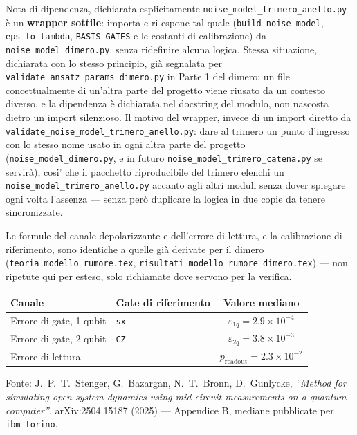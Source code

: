 \documentclass[11pt,a4paper]{article}
\begin{document}
\begin{okbox}{Nota di dipendenza, dichiarata esplicitamente}
\texttt{noise\_model\_trimero\_anello.py} è un \textbf{wrapper sottile}:
importa e ri-espone tal quale (\texttt{build\_noise\_model},
\texttt{eps\_to\_lambda}, \texttt{BASIS\_GATES} e le costanti di
calibrazione) da \texttt{noise\_model\_dimero.py}, senza ridefinire
alcuna logica. Stessa situazione, dichiarata con lo stesso principio, già
segnalata per \texttt{validate\_ansatz\_params\_dimero.py} in Parte 1 del
dimero: un file concettualmente di un'altra parte del progetto viene
riusato da un contesto diverso, e la dipendenza è dichiarata nel
docstring del modulo, non nascosta dietro un import silenzioso. Il
motivo del wrapper, invece di un import diretto da
\texttt{validate\_noise\_model\_trimero\_anello.py}: dare al trimero un
punto d'ingresso con lo stesso nome usato in ogni altra parte del
progetto (\texttt{noise\_model\_dimero.py}, e in futuro
\texttt{noise\_model\_trimero\_catena.py} se servirà), cosi' che il
pacchetto riproducibile del trimero elenchi un
\texttt{noise\_model\_trimero\_anello.py} accanto agli altri moduli senza
dover spiegare ogni volta l'assenza --- senza però duplicare la logica in
due copie da tenere sincronizzate.
\end{okbox}

Le formule del canale depolarizzante e dell'errore di lettura, e la
calibrazione di riferimento, sono identiche a quelle già derivate per il
dimero (\texttt{teoria\_modello\_rumore.tex},
\texttt{risultati\_modello\_rumore\_dimero.tex}) --- non ripetute qui per
esteso, solo richiamate dove servono per la verifica.

\begin{center}
\renewcommand{\arraystretch}{1.3}
\begin{tabular}{@{}llc@{}}
\toprule
\textbf{Canale} & \textbf{Gate di riferimento} & \textbf{Valore mediano}\\
\midrule
Errore di gate, 1 qubit & \texttt{sx} & $\varepsilon_{1q}=2.9\times10^{-4}$\\
Errore di gate, 2 qubit & \texttt{CZ} & $\varepsilon_{2q}=3.8\times10^{-3}$\\
Errore di lettura & --- & $p_\text{readout}=2.3\times10^{-2}$\\
\bottomrule
\end{tabular}
\end{center}
Fonte: J.~P.~T.~Stenger, G.~Bazargan, N.~T.~Bronn, D.~Gunlycke,
\emph{``Method for simulating open-system dynamics using mid-circuit
measurements on a quantum computer''}, arXiv:2504.15187 (2025) ---
Appendice B, mediane pubblicate per \texttt{ibm\_torino}.
\end{document}
